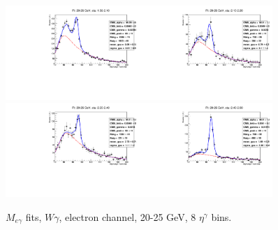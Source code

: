\begin{figure}[htb]
\begin{center}
   \includegraphics[width=0.45\textwidth]{../figs/figs_v11/ELECTRON_WGamma/EtoGammaFits/sa_hZmass_h_Data_EtoGamma_Enr_ENDCAP_pt20to25_ieta0.pdf}\includegraphics[width=0.45\textwidth]{../figs/figs_v11/ELECTRON_WGamma/EtoGammaFits/sa_hZmass_h_Data_EtoGamma_Enr_ENDCAP_pt20to25_ieta1.pdf}\\
   \includegraphics[width=0.45\textwidth]{../figs/figs_v11/ELECTRON_WGamma/EtoGammaFits/sa_hZmass_h_Data_EtoGamma_Enr_ENDCAP_pt20to25_ieta2.pdf}\includegraphics[width=0.45\textwidth]{../figs/figs_v11/ELECTRON_WGamma/EtoGammaFits/sa_hZmass_h_Data_EtoGamma_Enr_ENDCAP_pt20to25_ieta3.pdf}\\
  \label{fig:etogFits_20to25}
  \caption{$M_{e\gamma}$ fits, $W\gamma$, electron channel, 20-25 GeV, 8 $\eta^{\gamma}$ bins.}
  \end{center}
\end{figure}

